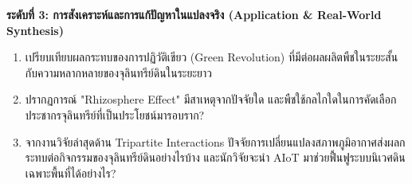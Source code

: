 \noindent \textbf{ระดับที่ 3: การสังเคราะห์และการแก้ปัญหาในแปลงจริง (Application \& Real-World Synthesis)}
\begin{enumerate}[resume]
    \item เปรียบเทียบผลกระทบของการปฏิวัติเขียว (Green Revolution) ที่มีต่อผลผลิตพืชในระยะสั้นกับความหลากหลายของจุลินทรีย์ดินในระยะยาว
    \item ปรากฏการณ์ "Rhizosphere Effect" มีสาเหตุจากปัจจัยใด และพืชใช้กลไกใดในการคัดเลือกประชากรจุลินทรีย์ที่เป็นประโยชน์มารอบราก?
    \item จากงานวิจัยล่าสุดด้าน Tripartite Interactions ปัจจัยการเปลี่ยนแปลงสภาพภูมิอากาศส่งผลกระทบต่อกิจกรรมของจุลินทรีย์ดินอย่างไรบ้าง และนักวิจัยจะนำ AIoT มาช่วยฟื้นฟูระบบนิเวศดินเฉพาะพื้นที่ได้อย่างไร?
\end{enumerate}
